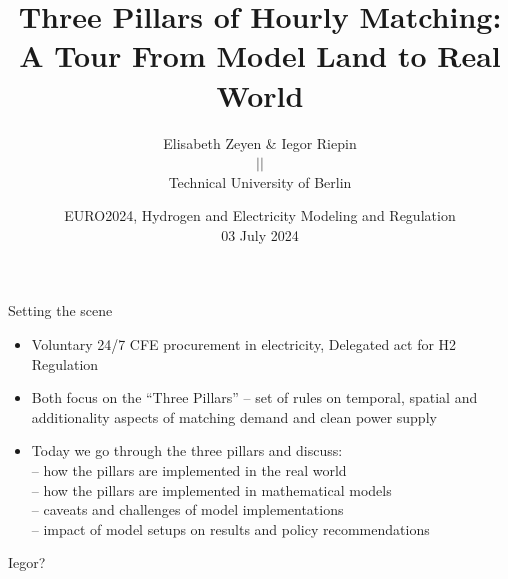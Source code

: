 


\title{Three Pillars of Hourly Matching: \\ A Tour From Model Land to Real World}

\author{
  Elisabeth Zeyen \& Iegor Riepin\\
   $\vert\vert$ 
   \\
  Technical University of Berlin
  }

\date{EURO2024, Hydrogen and Electricity Modeling and Regulation\\ 
      03 July 2024 \\

}


  


\maketitle



\begin{frame}{Setting the scene}
  
  \begin{itemize}
    \item Voluntary 24/7 CFE procurement in electricity, Delegated act for H2 Regulation
    \item Both focus on the \enquote{Three Pillars} -- set of rules on temporal, spatial and additionality aspects of matching demand and clean power supply
    \item Today we go through the \alert{three pillars} and discuss: \\
    -- how the pillars are implemented in the real world \\
    -- how the pillars are implemented in mathematical models \\
    -- caveats and challenges of model implementations \\
    -- impact of model setups on results and policy recommendations \\
  \end{itemize}

  Iegor?
  
\end{frame}


